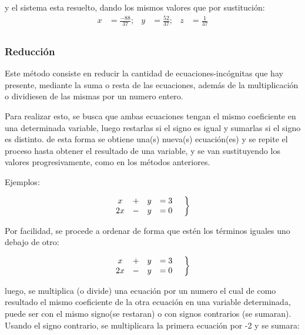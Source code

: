 \documentclass[12pt]{article}
\begin{document}
    y el sistema esta resuelto, dando los mismos valores que por sustitución:
    \begin{align*}
        x &=\frac{-88}{37} ;& y&=\frac{52}{37} ;& z&=\frac{1}{37}  		\\
    \end{align*}


    \subsubsection*{Reducción} \label{Reduccion}

    Este método consiste en reducir la cantidad de ecuaciones-incógnitas que hay
    presente, mediante la suma o resta de las ecuaciones, además de la multiplicación
    o dividiesen de las mismas por un numero entero.

    Para realizar esto, se busca que ambas ecuaciones tengan el mismo coeficiente
    en una determinada variable, luego restarlas si el signo es igual y sumarlas
    si el signo es distinto. de esta forma se obtiene una(s) nueva(s) ecuación(es)
    y se repite el proceso hasta obtener el resultado de una variable, y se
    van sustituyendo los valores progresivamente, como en los métodos anteriores.

    Ejemplos:

    \begin{equation*}
        \left.
        \begin{matrix}
            x &+& y &=3\\
            2x &-& y &=0
        \end{matrix}
        \hspace*{0.5cm}\right\rbrace
    \end{equation*}

    Por facilidad, se procede a ordenar de forma que estén los términos iguales
    uno debajo de otro:

    \begin{equation*}
        \left.
        \begin{matrix}
            x &+& y &=3\\
            2x &-& y &=0
        \end{matrix}
        \hspace*{0.5cm}\right\rbrace
    \end{equation*}

    luego, se multiplica (o divide) una ecuación por un numero el cual de como resultado el
    mismo coeficiente de la otra ecuación en una variable determinada, puede ser
    con el mismo signo(se restaran) o con signos contrarios (se sumaran). Usando
    el signo contrario, se multiplicara la primera ecuación por -2 y se sumara:
\end{document}
